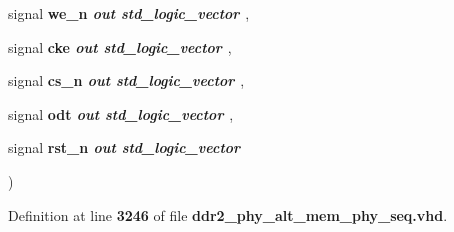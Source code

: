 {\begin{DoxyParamCaption}
\item[{\textcolor{keywordtype}{signal } }]{{\bfseries \textcolor{vhdlchar}{we\+\_\+n}\textcolor{vhdlchar}{ }}\textcolor{stringliteral}{} {\em {\bfseries \textcolor{keywordflow}{out}\textcolor{vhdlchar}{ }\textcolor{comment}{std\+\_\+logic\+\_\+vector}\textcolor{vhdlchar}{ }\textcolor{vhdlchar}{ }\textcolor{vhdlchar}{ }}} , }
\item[{\textcolor{keywordtype}{signal } }]{{\bfseries \textcolor{vhdlchar}{cke}\textcolor{vhdlchar}{ }}\textcolor{stringliteral}{} {\em {\bfseries \textcolor{keywordflow}{out}\textcolor{vhdlchar}{ }\textcolor{comment}{std\+\_\+logic\+\_\+vector}\textcolor{vhdlchar}{ }\textcolor{vhdlchar}{ }\textcolor{vhdlchar}{ }}} , }
\item[{\textcolor{keywordtype}{signal } }]{{\bfseries \textcolor{vhdlchar}{cs\+\_\+n}\textcolor{vhdlchar}{ }}\textcolor{stringliteral}{} {\em {\bfseries \textcolor{keywordflow}{out}\textcolor{vhdlchar}{ }\textcolor{comment}{std\+\_\+logic\+\_\+vector}\textcolor{vhdlchar}{ }\textcolor{vhdlchar}{ }\textcolor{vhdlchar}{ }}} , }
\item[{\textcolor{keywordtype}{signal } }]{{\bfseries \textcolor{vhdlchar}{odt}\textcolor{vhdlchar}{ }}\textcolor{stringliteral}{} {\em {\bfseries \textcolor{keywordflow}{out}\textcolor{vhdlchar}{ }\textcolor{comment}{std\+\_\+logic\+\_\+vector}\textcolor{vhdlchar}{ }\textcolor{vhdlchar}{ }\textcolor{vhdlchar}{ }}} , }
\item[{\textcolor{keywordtype}{signal } }]{{\bfseries \textcolor{vhdlchar}{rst\+\_\+n}\textcolor{vhdlchar}{ }}\textcolor{stringliteral}{} {\em {\bfseries \textcolor{keywordflow}{out}\textcolor{vhdlchar}{ }\textcolor{comment}{std\+\_\+logic\+\_\+vector}\textcolor{vhdlchar}{ }\textcolor{vhdlchar}{ }\textcolor{vhdlchar}{ }}}}
\end{DoxyParamCaption}
)\hspace{0.3cm}{\ttfamily [Procedure]}}\label{class__ddr2__phy__alt__mem__phy__addr__cmd__pkg_a762ad6f3d76e3c01f0ef458e3dac73f6}


Definition at line {\bf 3246} of file {\bf ddr2\+\_\+phy\+\_\+alt\+\_\+mem\+\_\+phy\+\_\+seq.\+vhd}.

